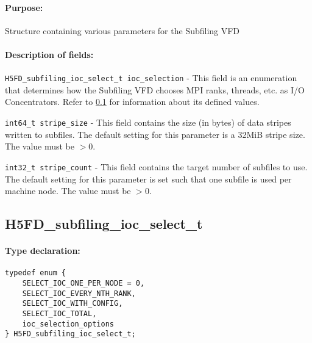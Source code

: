 \documentclass[../main.tex]{subfiles}
\begin{document}
\paragraph{Purpose:}
\begin{flushleft}%
Structure containing various parameters for the Subfiling VFD
\end{flushleft}%

\paragraph{Description of fields:}
\begin{flushleft}%
\texttt{H5FD\_subfiling\_ioc\_select\_t ioc\_selection} - This field is an enumeration that
determines how the Subfiling VFD chooses MPI ranks, threads, etc. as I/O Concentrators. Refer
to \ref{ref:h5fd_subfiling_ioc_select_t} for information about its defined values.

\texttt{int64\_t stripe\_size} - This field contains the size (in bytes) of data stripes
written to subfiles. The default setting for this parameter is a 32MiB stripe size. The value
must be $> 0$.

\texttt{int32\_t stripe\_count} - This field contains the target number of subfiles to use.
The default setting for this parameter is set such that one subfile is used per machine node.
The value must be $> 0$.
\end{flushleft}%

\newpage

\subsection{H5FD\_subfiling\_ioc\_select\_t}
\label{ref:h5fd_subfiling_ioc_select_t}

\paragraph{Type declaration:}
\begin{flushleft}%
\begin{verbatim}
typedef enum {
    SELECT_IOC_ONE_PER_NODE = 0,
    SELECT_IOC_EVERY_NTH_RANK,
    SELECT_IOC_WITH_CONFIG,
    SELECT_IOC_TOTAL,
    ioc_selection_options
} H5FD_subfiling_ioc_select_t;
\end{verbatim}
\end{flushleft}%
\end{document}
